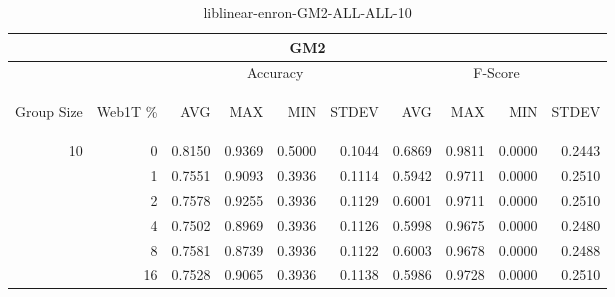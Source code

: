\begin{center}
\begin{table}[htbp]
\begin{tabular}{ | r | r | r | r | r | r | r | r | r | r |}
\hline
\multicolumn{10}{|c|}{GM2}\\
\hline
 & & \multicolumn{4}{|c|}{Accuracy} & \multicolumn{4}{|c|}{F-Score}\\ \cline{3-10}
\begin{sideways}Group Size\end{sideways} & \begin{sideways}Web1T \%\end{sideways} & \begin{sideways}AVG\end{sideways} & \begin{sideways}MAX\end{sideways} & \begin{sideways}MIN\end{sideways} & \begin{sideways}STDEV\end{sideways} & \begin{sideways}AVG\end{sideways} & \begin{sideways}MAX\end{sideways} & \begin{sideways}MIN\end{sideways} & \begin{sideways}STDEV\end{sideways}\\
\hline
\multirow{6}{*}{10}
 & 0 & 0.8150 & 0.9369 & 0.5000 & 0.1044 & 0.6869 & 0.9811 & 0.0000 & 0.2443\\ \cline{2-10}
 & 1 & 0.7551 & 0.9093 & 0.3936 & 0.1114 & 0.5942 & 0.9711 & 0.0000 & 0.2510\\ \cline{2-10}
 & 2 & 0.7578 & 0.9255 & 0.3936 & 0.1129 & 0.6001 & 0.9711 & 0.0000 & 0.2510\\ \cline{2-10}
 & 4 & 0.7502 & 0.8969 & 0.3936 & 0.1126 & 0.5998 & 0.9675 & 0.0000 & 0.2480\\ \cline{2-10}
 & 8 & 0.7581 & 0.8739 & 0.3936 & 0.1122 & 0.6003 & 0.9678 & 0.0000 & 0.2488\\ \cline{2-10}
 & 16 & 0.7528 & 0.9065 & 0.3936 & 0.1138 & 0.5986 & 0.9728 & 0.0000 & 0.2510\\ \cline{2-10}
\hline
\end{tabular}
\caption{liblinear-enron-GM2-ALL-ALL-10}
\end{table}
\end{center}

